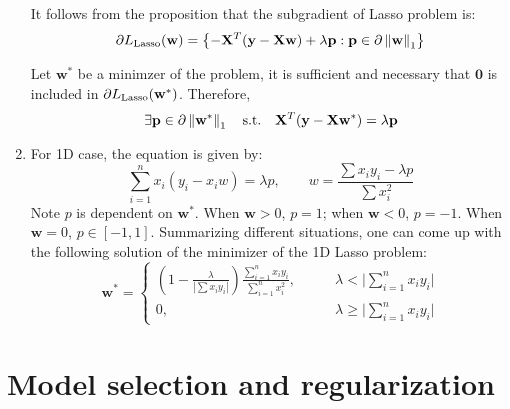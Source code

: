\documentclass[a4paper, 10pt]{article}
\newcommand{\annot}[1]{{\rm #1}}
\begin{document}
\begin{enumerate}[label=(\alph*)]
    It follows from the proposition that the subgradient of Lasso problem is:
    \begin{equation}
        \partial L_{\annot{Lasso}}(\mathbf{w}) = \left\{ - \mathbf{X}^T (\mathbf{y} - \mathbf{X} \mathbf{w}) + \lambda \mathbf{p}: \mathbf{p} \in \partial \left\|\mathbf{w}\right\|_1 \right\}
    \end{equation}
    
    Let $\mathbf{w}^*$ be a minimzer of the problem, it is sufficient and necessary that $\mathbf{0}$ is included in $\partial L_{\annot{Lasso}}(\mathbf{w}^*)$. Therefore,
    \begin{equation}
        \exists \mathbf{p} \in \partial \left\| \mathbf{w}^* \right\|_1 \quad \annot{s.t.}\quad \mathbf{X}^T (\mathbf{y} - \mathbf{X} \mathbf{w}^*) = \lambda \mathbf{p}
    \end{equation}
    
    \item For 1D case, the equation is given by:
    \begin{equation}
        \sum_{i=1}^n x_i \left(y_i - x_i w\right) = \lambda p, \qquad w = \frac{\sum x_i y_i - \lambda p}{\sum x_i^2}
    \end{equation}
    Note $p$ is dependent on $\mathbf{w}^*$. When $\mathbf{w} > 0$, $p = 1$; when $\mathbf{w} < 0$, $p = -1$. When $\mathbf{w} = 0$, $p\in [-1, 1]$. Summarizing different situations, one can come up with the following solution of the minimizer of the 1D Lasso problem:
    \begin{equation}
        \mathbf{w}^* = \left\{
        \begin{array}{ll}\displaystyle
            \left(1 - \frac{\lambda}{|\sum x_i y_i|}\right) \frac{\sum_{i=1}^n x_i y_i }{\sum_{i=1}^n x_i^2},\qquad &\lambda < \bigg|\sum_{i=1}^n x_i y_i \bigg| \\[1em]
            0, \qquad &\lambda \geq \bigg|\sum_{i=1}^n x_i y_i \bigg|            
        \end{array}\right.
    \end{equation}
\end{enumerate}

\clearpage

\section{Model selection and regularization}
\end{document}
